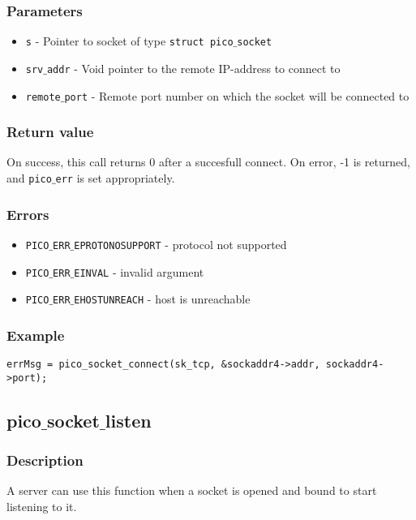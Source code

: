 \subsubsection*{Parameters}
\begin{itemize}[noitemsep]
\item \texttt{s} - Pointer to socket of type \texttt{struct pico$\_$socket}
\item \texttt{srv$\_$addr} - Void pointer to the remote IP-address to connect to
\item \texttt{remote$\_$port} - Remote port number on which the socket will be connected to
\end{itemize} 

\subsubsection*{Return value}
On success, this call returns 0 after a succesfull connect.
On error, -1 is returned, and \texttt{pico$\_$err} is set appropriately.

\subsubsection*{Errors}
\begin{itemize}[noitemsep]
\item \texttt{PICO$\_$ERR$\_$EPROTONOSUPPORT} - protocol not supported
\item \texttt{PICO$\_$ERR$\_$EINVAL} - invalid argument
\item \texttt{PICO$\_$ERR$\_$EHOSTUNREACH} - host is unreachable 
\end{itemize}

\subsubsection*{Example}
\begin{verbatim}
errMsg = pico_socket_connect(sk_tcp, &sockaddr4->addr, sockaddr4->port);
\end{verbatim}


\subsection{pico$\_$socket$\_$listen}

\subsubsection*{Description}
A server can use this function when a socket is opened and bound to start listening to it.

